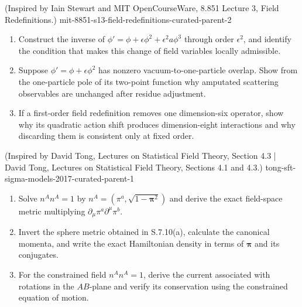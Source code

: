 \begin{enumerate}
  {(Inspired by Iain Stewart and MIT OpenCourseWare, 8.851 Lecture 3, Field Redefinitions.)}
  {mit-8851-s13-field-redefinitions-curated-parent-2}
\begin{enumerate}
\item
Construct the inverse of
\(\phi'=\phi+\epsilon\phi^2+\epsilon^2a\phi^3\)
through order \(\epsilon^2\), and identify the condition that makes this
change of field variables locally admissible.
\item
Suppose \(\phi'=\phi+\epsilon\phi^2\) has nonzero vacuum-to-one-particle
overlap.  Show from the one-particle pole of its two-point function why
amputated scattering observables are unchanged after residue adjustment.
\item
If a first-order field redefinition removes one dimension-six operator,
show why its quadratic action shift produces dimension-eight
interactions and why discarding them is consistent only at fixed order.
\end{enumerate}

  {(Inspired by David Tong, Lectures on Statistical Field Theory, Section 4.3 | David Tong, Lectures on Statistical Field Theory, Sections 4.1 and 4.3.)}
  {tong-sft-sigma-models-2017-curated-parent-1}
\begin{enumerate}
\item
Solve \(n^An^A=1\) by
\(n^A=(\pi^a,\sqrt{1-\boldsymbol\pi^2})\) and derive the exact
field-space metric multiplying \(\partial_\mu\pi^a\partial^\mu\pi^b\).
\item
Invert the sphere metric obtained in S.7.10(a), calculate the canonical
momenta, and write the exact Hamiltonian density in terms of
\(\boldsymbol\pi\) and its conjugates.
\item
For the constrained field \(n^An^A=1\), derive the current associated
with rotations in the \(AB\)-plane and verify its conservation using
the constrained equation of motion.
\end{enumerate}


\end{enumerate}
